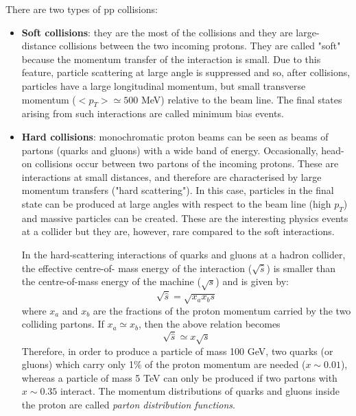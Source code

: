 \documentclass[a4paper, oneside, 11pt, openright]{book}
\begin{document}
					There are two types of pp collisions:
					\begin{itemize}
						\item \textbf{Soft collisions}: 
						they are the most of the collisions and they are large-distance collisions between the two incoming protons. They are called "soft" because the momentum transfer of the interaction is small. Due to this feature, particle scattering at large angle is suppressed and so, after collisions, particles have a large longitudinal momentum, but small transverse momentum ($<p_T>\simeq500$ MeV) relative to the beam line. The final states
						arising from such interactions are called minimum bias events.
						\item \textbf{Hard collisions}:
						monochromatic proton beams can be seen as beams of partons (quarks and gluons) with a wide band
						of energy. Occasionally, head-on collisions occur between two partons of the incoming protons. These are interactions at small distances, and therefore are characterised by large
						momentum transfers ("hard scattering"). In this case, particles in the final state can be produced at large angles with respect to the beam line (high $p_T$) and massive particles can be created.
						These are the interesting physics events at a collider but they are, however, rare compared to the soft interactions.
						
						In the hard-scattering interactions of quarks and gluons at a hadron collider, the effective centre-of-
						mass energy of the interaction ($\sqrt{\hat{s}}$) is smaller than the centre-of-mass energy of the machine ($\sqrt{s}$) and is given by: 
						$$ 
						\sqrt{\hat{s}} = \sqrt{x_ax_bs}
						$$
						where $x_a$ and $x_b$ are the fractions of the proton momentum carried by the two colliding partons. If $x_a \simeq x_b$, then the above relation becomes
						$$ 
						\sqrt{\hat{s}} \simeq x\sqrt{s}
						$$
						Therefore, in order to produce a particle of mass 100 GeV, two quarks (or gluons) which carry only 1\% of the proton momentum are needed ($x \sim 0.01$), whereas a particle of mass 5 TeV can only be produced if two partons with $x \sim 0.35$ interact. The momentum distributions of quarks and gluons inside the proton are called \textit{parton distribution functions}. %
			\end{itemize}
\end{document}

